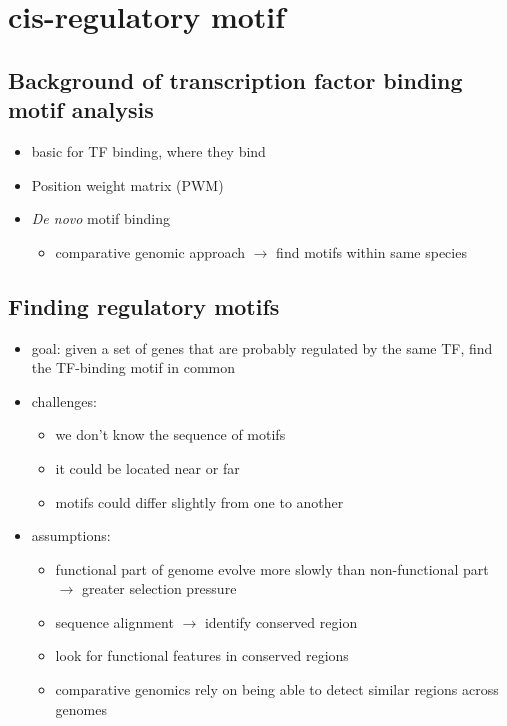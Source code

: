\documentclass[font=12pt]{article}
\begin{document}
\newpage
\section{cis-regulatory motif}
\subsection{Background of transcription factor binding motif analysis}
\begin{itemize}
	\item basic for TF binding, where they bind
	\item Position weight matrix (PWM)
	\item \textit{De novo} motif binding
	\begin{itemize}
		\item comparative genomic approach $\to$ find motifs within same species
	\end{itemize}
\end{itemize}

\subsection{Finding regulatory motifs}
\begin{itemize}
	\item goal: given a set of genes that are probably regulated by the same TF, find the TF-binding motif in common
	\item challenges: \begin{itemize}
		\item we don't know the sequence of motifs
		\item it could be located near or far
		\item motifs could differ slightly from one to another
	\end{itemize}
	\item assumptions: \begin{itemize}
		\item functional part of genome evolve more slowly than non-functional part $\to$ greater selection pressure
		\item sequence alignment $\to$ identify conserved region
		\item look for functional features in conserved regions
		\item comparative genomics rely on being able to detect similar regions across genomes
	\end{itemize}
\end{itemize}
\end{document}
